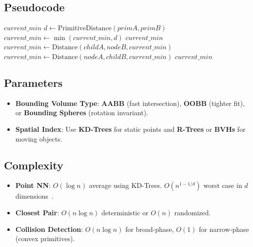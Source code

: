 \subsection{Pseudocode}

\begin{algorithm}[htbp]
\caption{BVH Distance Query}
\label{alg:bvh_distance}
\begin{algorithmic}[1]
    \State \Return $current\_min$
  \EndIf
        \State $d \gets \text{PrimitiveDistance}(primA, primB)$
        \State $current\_min \gets \min(current\_min, d)$
      \EndFor
    \EndFor
    \State \Return $current\_min$
  \EndIf
      \State $current\_min \gets \text{Distance}(childA, nodeB, current\_min)$
    \EndFor
  \Else
      \State $current\_min \gets \text{Distance}(nodeA, childB, current\_min)$
    \EndFor
  \EndIf
  \State \Return $current\_min$
\EndFunction
\end{algorithmic}
\end{algorithm}

\subsection{Parameters}

\begin{itemize}
\item \textbf{Bounding Volume Type}: \textbf{AABB} (fast intersection), \textbf{OOBB} (tighter fit), or \textbf{Bounding Spheres} (rotation invariant).
\item \textbf{Spatial Index}: Use \textbf{KD-Trees} for static points and \textbf{R-Trees} or \textbf{BVHs} for moving objects.
\end{itemize}

\subsection{Complexity}

\begin{itemize}
\item \textbf{Point NN}: $O(\log n)$ average using KD-Trees. $O(n^{1-1/d})$ worst case in $d$ dimensions~\cite{bentley1975}.
\item \textbf{Closest Pair}: $O(n \log n)$ deterministic or $O(n)$ randomized.
\item \textbf{Collision Detection}: $O(n \log n)$ for broad-phase, $O(1)$ for narrow-phase (convex primitives).
\end{itemize}

